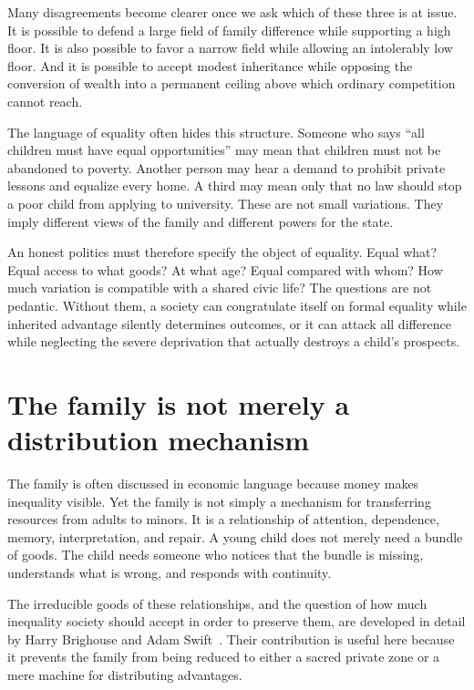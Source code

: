 ﻿\documentclass[12pt,a4paper]{book}
\begin{document}
Many disagreements become clearer once we ask which of these three is at
issue.  It is possible to defend a large field of family difference while
supporting a high floor.  It is also possible to favor a narrow field while
allowing an intolerably low floor.  And it is possible to accept modest
inheritance while opposing the conversion of wealth into a permanent
ceiling above which ordinary competition cannot reach.

The language of equality often hides this structure.  Someone who says
``all children must have equal opportunities'' may mean that children must
not be abandoned to poverty.  Another person may hear a demand to prohibit
private lessons and equalize every home.  A third may mean only that no law
should stop a poor child from applying to university.  These are not small
variations.  They imply different views of the family and different powers
for the state.

An honest politics must therefore specify the object of equality.  Equal
what?  Equal access to what goods?  At what age?  Equal compared with whom?
How much variation is compatible with a shared civic life?  The questions
are not pedantic.  Without them, a society can congratulate itself on
formal equality while inherited advantage silently determines outcomes, or
it can attack all difference while neglecting the severe deprivation that
actually destroys a child's prospects.

\section{The family is not merely a distribution mechanism}

The family is often discussed in economic language because money makes
inequality visible.  Yet the family is not simply a mechanism for
transferring resources from adults to minors.  It is a relationship of
attention, dependence, memory, interpretation, and repair.  A young child
does not merely need a bundle of goods.  The child needs someone who notices
that the bundle is missing, understands what is wrong, and responds with
continuity.

The irreducible goods of these relationships, and the question of how much
inequality society should accept in order to preserve them, are developed in
detail by Harry Brighouse and Adam Swift~\cite{BrighouseSwift2014}.  Their
contribution is useful here because it prevents the family from being
reduced to either a sacred private zone or a mere machine for distributing
advantages.
\end{document}
